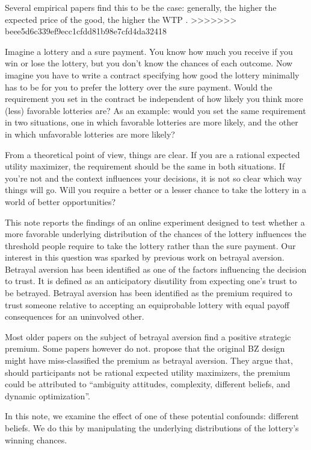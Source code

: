Several empirical papers find this to be the case: generally, the higher the expected price of the good, the higher the WTP \citep[for a short review of this literature, see]{Tymula2016}.
>>>>>>> beee5d6c339ef9ecc1cfdd81b98e7cfd4da32418


Imagine a lottery and a sure payment.
You know how much you receive if you win or lose the lottery, but you don't know the chances of each outcome.
Now imagine you have to write a contract specifying how good the lottery minimally has to be for you to prefer the lottery over the sure payment.
Would the requirement you set in the contract be independent of how likely you think more (less) favorable lotteries are?
As an example: would you set the same requirement in two situations, one in which favorable lotteries are more likely, and the other in which unfavorable lotteries are more likely?

From a theoretical point of view, things are clear.
If you are a rational expected utility maximizer, the requirement should be the same in both situations.
If you're not and the context influences your decisions, it is not so clear which way things will go.
Will you require a better or a lesser chance to take the lottery in a world of better opportunities?

This note reports the findings of an online experiment designed to test whether a more favorable underlying distribution of the chances of the lottery influences the threshold people require to take the lottery rather than the sure payment.
Our interest in this question was sparked by previous work on betrayal aversion.
Betrayal aversion has been identified as one of the factors influencing the decision to trust.
It is defined as an anticipatory disutility from expecting one's trust to be betrayed.
Betrayal aversion has been identified as the premium required to trust someone relative to accepting an equiprobable lottery with equal payoff consequences for an uninvolved other.

Most older papers on the subject of betrayal aversion find a positive strategic premium.
Some papers however do not.
\cite{Li2020a} propose that the original BZ design might have miss-classified the premium as betrayal aversion.
They argue that, should participants not be rational expected utility maximizers, the premium could be attributed to ``ambiguity attitudes, complexity, different beliefs, and dynamic optimization''.

In this note, we examine the effect of one of these potential confounds: different beliefs.
We do this by manipulating the underlying distributions of the lottery's winning chances.


